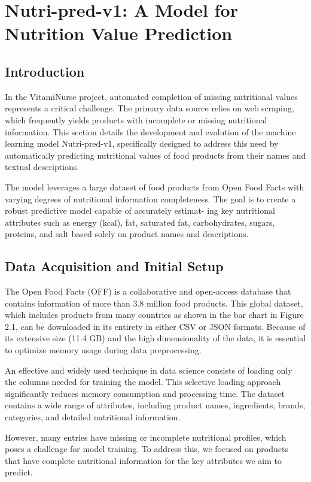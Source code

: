 \chapter{Nutri-pred-v1: A Model for Nutrition Value Prediction}

\section{Introduction}
\par In the VitamiNurse project, automated completion of missing nutritional
values represents a critical challenge. The primary data source relies
on web scraping, which frequently yields products with incomplete or
missing nutritional information. This section details the development
and evolution of the machine learning model Nutri-pred-v1, specifically
designed to address this need by automatically predicting nutritional
values of food products from their names and textual descriptions.
\par The model leverages a large dataset of food products from Open Food
Facts with varying degrees of nutritional information completeness. The
goal is to create a robust predictive model capable of accurately estimat-
ing key nutritional attributes such as energy (kcal), fat, saturated fat,
carbohydrates, sugars, proteins, and salt based solely on product names
and descriptions.
\section{Data Acquisition and Initial Setup}
The Open Food Facts (OFF) is a collaborative and open-access database
that contains information of more than 3.8 million food products. This
global dataset, which includes products from many countries as shown in
the bar chart in Figure 2.1, can be downloaded in its entirety in either
CSV or JSON formats. Because of its extensive size (11.4 GB) and the
high dimensionality of the data, it is essential to optimize memory usage
during data preprocessing.

\par An effective and widely used technique in data science consists of loading
only the columns needed for training the model. This selective loading
approach significantly reduces memory consumption and processing time.
The dataset contains a wide range of attributes, including product names,
ingredients, brands, categories, and detailed nutritional information.
\par However, many entries have missing or incomplete nutritional profiles,
which poses a challenge for model training. To address this, we focused on
products that have complete nutritional information for the key attributes
we aim to predict.


